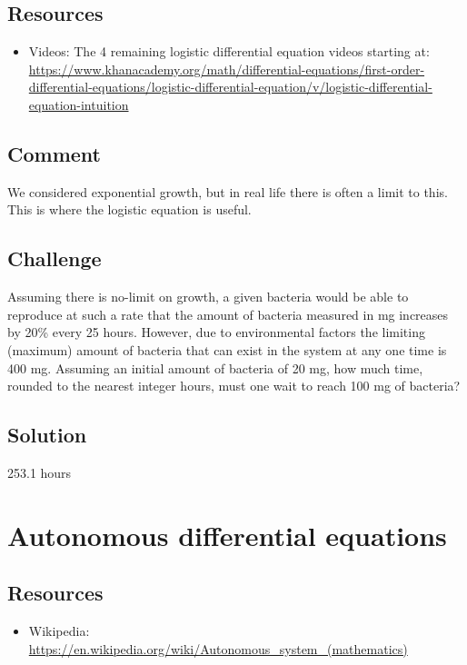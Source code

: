\subsection*{Resources}
\begin{itemize}
    \item Videos: The 4 remaining logistic differential equation videos starting at: \url{https://www.khanacademy.org/math/differential-equations/first-order-differential-equations/logistic-differential-equation/v/logistic-differential-equation-intuition}
\end{itemize}

\subsection*{Comment}
We considered exponential growth, but in real life there is often a limit to this. This is where the logistic equation is useful.

\subsection*{Challenge}
Assuming there is no-limit on growth, a given bacteria would be able to reproduce at such a rate that the amount of bacteria measured in mg increases by 20\% every 25 hours. However, due to environmental factors the limiting (maximum) amount of bacteria that can exist in the system at any one time is 400 mg. Assuming an initial amount of bacteria of 20 mg, how much time, rounded to the nearest integer hours, must one wait to reach 100 mg of bacteria?

\subsection*{Solution}
253.1 hours



\newpage
\section{Autonomous differential equations}

\subsection*{Resources}
\begin{itemize}
    \item Wikipedia: \url{https://en.wikipedia.org/wiki/Autonomous_system_(mathematics)}
\end{itemize}

